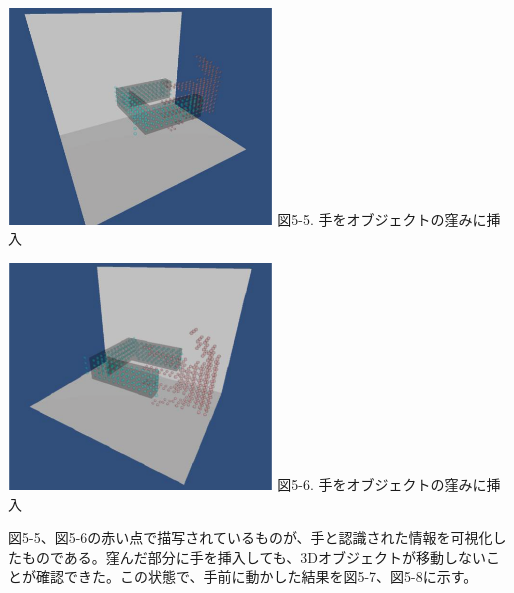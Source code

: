  \vspace{5mm}
\begin{minipage}{0.5\hsize}
  \begin{center}
   \includegraphics[width=70mm]{3D_obje_insert_1.eps}
   図5-5. 手をオブジェクトの窪みに挿入
  \end{center}
  \label{fig:one}
 \end{minipage}
 \begin{minipage}{0.5\hsize}
  \begin{center}
   \includegraphics[width=70mm]{3D_obje_insert_2.eps}
   図5-6. 手をオブジェクトの窪みに挿入
  \end{center}
  \label{fig:two}
 \end{minipage}
 
 図5-5、図5-6の赤い点で描写されているものが、手と認識された情報を可視化したものである。窪んだ部分に手を挿入しても、3Dオブジェクトが移動しないことが確認できた。この状態で、手前に動かした結果を図5-7、図5-8に示す。
 
